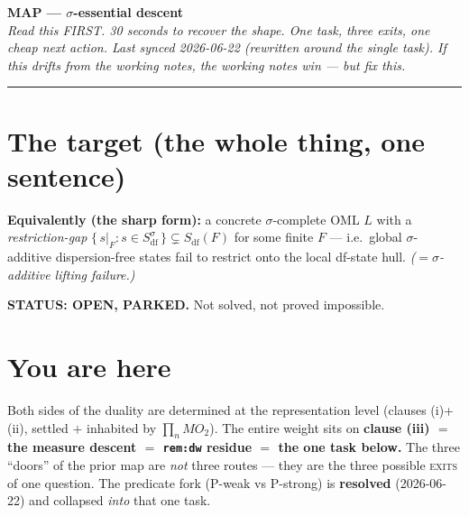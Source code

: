 \documentclass[9pt]{extarticle}
\newcommand{\Sdf}{S_{\mathrm{df}}}
\newcommand{\Sdfs}{S_{\mathrm{df}}^{\sigma}}
\newcommand{\remdw}{\texttt{rem:dw}}
\begin{document}
\begin{center}
{\large\bfseries MAP --- $\sigma$-essential descent}\\[1pt]
{\footnotesize\itshape Read this FIRST. 30 seconds to recover the shape. One task, three
exits, one cheap next action. Last synced 2026-06-22 (rewritten around the single task).
If this drifts from the working notes, the working notes win --- but fix this.}
\end{center}

\vspace{-2pt}
\hrule
\vspace{3pt}
\small

\section*{The target (the whole thing, one sentence)}

\begingroup\centering
{}\par
\endgroup
\vspace{2pt}

\textbf{Equivalently (the sharp form):} a concrete $\sigma$-complete OML $L$ with a
\emph{restriction-gap} $\{\, s|_F : s \in \Sdfs \,\} \subsetneq \Sdf(F)$ for some finite
$F$ --- i.e.\ global $\sigma$-additive dispersion-free states fail to restrict onto the
local df-state hull. \emph{($=\sigma$-additive lifting failure.)}

\textbf{STATUS: OPEN, PARKED.} Not solved, not proved impossible.

\section*{You are here}

Both sides of the duality are determined at the representation level (clauses
(i)+(ii), settled $+$ inhabited by $\prod_n MO_2$). The entire weight sits on
\textbf{clause (iii) $=$ the measure descent $=$ \remdw{} residue $=$ the one task
below.} The three ``doors'' of the prior map are \emph{not} three routes --- they are
the three possible \textsc{exits} of one question. The predicate fork (P-weak vs
P-strong) is \textbf{resolved} (2026-06-22) and collapsed \emph{into} that one task.
\end{document}
